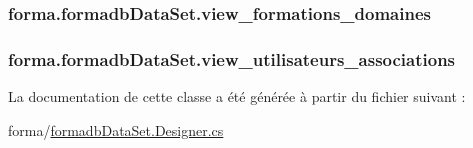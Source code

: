 \subsubsection[{\texorpdfstring{view\+\_\+formations\+\_\+domaines}{view_formations_domaines}}]{ forma.\+formadb\+Data\+Set.\+view\+\_\+formations\+\_\+domaines\hspace{0.3cm}{\ttfamily [get]}}\hypertarget{classforma_1_1formadb_data_set_aff503da54bb68a48a83b1f161d49faff}{}\label{classforma_1_1formadb_data_set_aff503da54bb68a48a83b1f161d49faff}
\subsubsection[{\texorpdfstring{view\+\_\+utilisateurs\+\_\+associations}{view_utilisateurs_associations}}]{ forma.\+formadb\+Data\+Set.\+view\+\_\+utilisateurs\+\_\+associations\hspace{0.3cm}{\ttfamily [get]}}\hypertarget{classforma_1_1formadb_data_set_a3fb3479c27a002f34c962c20d336ac23}{}\label{classforma_1_1formadb_data_set_a3fb3479c27a002f34c962c20d336ac23}


La documentation de cette classe a été générée à partir du fichier suivant \+:\begin{DoxyCompactItemize}
\item 
forma/\hyperlink{formadb_data_set_8_designer_8cs}{formadb\+Data\+Set.\+Designer.\+cs}\end{DoxyCompactItemize}
